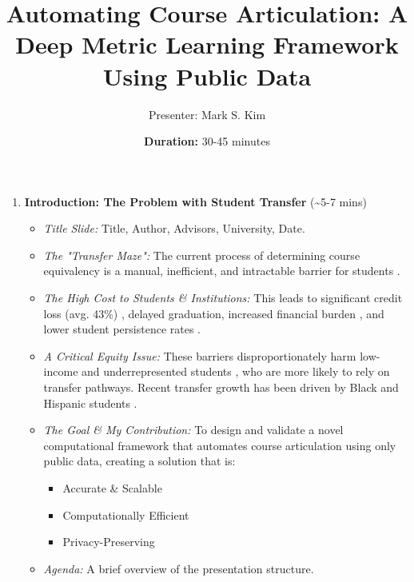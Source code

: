 \documentclass{article}
\title{Automating Course Articulation: A Deep Metric Learning Framework Using Public Data}
\author{Presenter: Mark S. Kim}
\date{\textbf{Duration:} 30-45 minutes}
\begin{document}
\maketitle

\begin{enumerate}
    \item \textbf{Introduction: The Problem with Student Transfer} (\textasciitilde5-7 mins)
    \begin{itemize}
        \item \textit{Title Slide:} Title, Author, Advisors, University, Date.
        \item \textit{The "Transfer Maze":} The current process of determining course equivalency is a manual, inefficient, and intractable barrier for students \cite{pardos2019}.
        \item \textit{The High Cost to Students \& Institutions:} This leads to significant credit loss (avg. 43\%) \cite{gao2017}, delayed graduation, increased financial burden \cite{collegeopportunity2017}, and lower student persistence rates \cite{porter1999}.
        \item \textit{A Critical Equity Issue:} These barriers disproportionately harm low-income and underrepresented students \cite{ace2025}, who are more likely to rely on transfer pathways. Recent transfer growth has been driven by Black and Hispanic students \cite{nscnews2023}.
        \item \textit{The Goal \& My Contribution:} To design and validate a novel computational framework that automates course articulation using only public data, creating a solution that is:
        \begin{itemize}
            \item Accurate \& Scalable
            \item Computationally Efficient
            \item Privacy-Preserving
        \end{itemize}
        \item \textit{Agenda:} A brief overview of the presentation structure.
    \end{itemize}


\end{enumerate}
\end{document}
